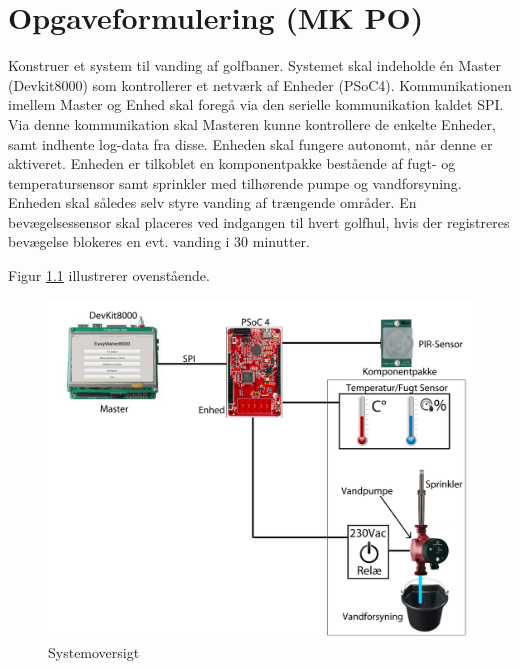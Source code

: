 \chapter{Opgaveformulering (MK PO)}

Konstruer et system til vanding af golfbaner. Systemet skal indeholde én Master (Devkit8000) som kontrollerer et netværk af Enheder (PSoC4). Kommunikationen imellem Master og Enhed skal foregå via den serielle kommunikation kaldet SPI. Via denne kommunikation skal Masteren kunne kontrollere de enkelte Enheder, samt indhente log-data fra disse. 
Enheden skal fungere autonomt, når denne er aktiveret. Enheden  er tilkoblet en komponentpakke bestående af fugt- og temperatursensor samt sprinkler med tilhørende pumpe og vandforsyning. Enheden skal således selv styre vanding af trængende områder. En bevægelsessensor skal placeres ved indgangen til hvert golfhul, hvis der registreres bevægelse blokeres en evt. vanding i 30 minutter.  

Figur \ref{fig:systemoversigt} illustrerer ovenstående.  

\begin{figure}[h]
  \centering
    \includegraphics[width=\textwidth]{Billeder/systemoversigt}
    \caption{Systemoversigt}
    \label{fig:systemoversigt}
\end{figure}
